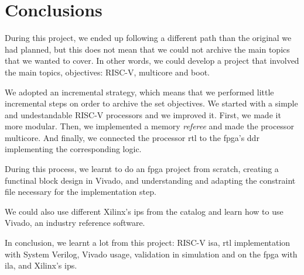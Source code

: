 \section{Conclusions}
During this project, we ended up following a different path than the original we had planned, but this does not mean that we could not archive the main topics that we wanted to cover.
In other words, we could develop a project that involved the main topics, objectives: RISC-V, multicore and boot. 

We adopted an incremental strategy, which means that we performed little incremental steps on order to archive the set objectives. We started with a simple and undestandable RISC-V processors and we improved it.
First, we made it more modular.
Then, we implemented a memory \textit{referee} and made the processor multicore. 
And finally, we connected the processor \gls{rtl} to the \gls{fpga}'s \gls{ddr} implementing the corresponding logic.

During this process, we learnt to do an \gls{fpga} project from scratch, creating a functinal block design in Vivado, and understanding and adapting the constraint file necessary for the implementation step.

We could also use different Xilinx's \glspl{ip} from the catalog and learn how to use Vivado, an industry reference software. 


In conclusion, we learnt a lot from this project: RISC-V \gls{isa}, \gls{rtl} implementation with System Verilog, Vivado usage, validation in simulation and on the \gls{fpga} with \gls{ila}, and Xilinx's \glspl{ip}.

